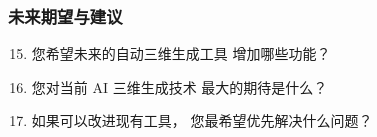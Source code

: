 {    \vspace{0.3em}

    \subsubsection{未来期望与建议}

    \begin{enumerate}
        \setcounter{enumi}{14}
        \setlength{\itemsep}{0pt}
        \setlength{\parskip}{0pt}

        \item 您希望未来的自动三维生成工具
        增加哪些功能？

        \item 您对当前 AI 三维生成技术
        最大的期待是什么？

        \item 如果可以改进现有工具，
        您最希望优先解决什么问题？
    \end{enumerate}

    \removeappendixsubsecmajornumbering
}